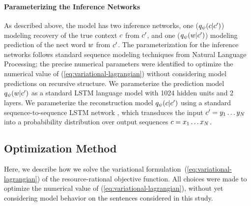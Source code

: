\paragraph{Parameterizing the Inference Networks}
As described above, the model has two inference networks, one ($q_\psi(c|c')$) modeling recovery of the true context $c$ from $c'$, and one ($q_\psi(w|c')$) modeling prediction of the nect word $w$ from $c'$.
The parameterization for the inference networks follows standard sequence modeling techniques from Natural Language Processing; the precise numerical parameters were identified to optimize the numerical value of (\ref{eq:variational-lagrangian}) without considering model predictions on recursive structure.
We parameterize the prediction model $q_\psi(w|c')$ as a standard LSTM language model \citep{DBLP:journals/neco/HochreiterS97} with 1024 hidden units and 2 layers.
We parameterize the reconstruction model $q_\psi(c|c')$ using a standard sequence-to-sequence LSTM network \citep{Sutskever2014SequenceTS, Luong2015EffectiveAT}, which transduces the input $c' = y_1 \dots y_N$ into a probabibility distribution over output sequences $c = x_1 \dots x_N$.


\subsection{Optimization Method}\label{sec:optimization-method}

Here, we describe how we solve the variational formulation~(\ref{eq:variational-lagrangian}) of the resource-rational objective function.
All choices were made to optimize the numerical value of (\ref{eq:variational-lagrangian}), without yet considering model behavior on the sentences considered in this study.


